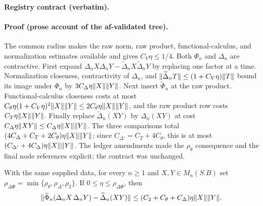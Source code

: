 \noindent\textbf{Registry contract (verbatim).}

\paragraph{Proof (prose account of the af-validated tree).}
The common radius makes the raw norm, raw product, functional-calculus, and normalization
estimates available and gives $C_V\eta\le1/4$.  Both $\Phi_n$ and $\Delta_n$ are contractive.
First expand
$\Delta_nX\Delta_nY-\widetilde\Delta_nX\widetilde\Delta_nY$ by replacing one factor at a
time.  Normalization closeness, contractivity of $\Delta_n$, and
$\lVert \widetilde\Delta_nT\rVert\le(1+C_V\eta)\lVert T\rVert$ bound its image under $\Phi_n$ by
$3C_\Delta\eta\lVert X\rVert\lVert Y\rVert$.  Next insert $\widetilde\Phi_n$ at the raw product.
Functional-calculus closeness costs at most
$C_\theta\eta(1+C_V\eta)^2\lVert X\rVert\lVert Y\rVert\le2C_\theta\eta\lVert X\rVert\lVert Y\rVert$,
and the raw product row costs $C_T\eta\lVert X\rVert\lVert Y\rVert$.  Finally replace
$\widetilde\Delta_n(XY)$ by $\Delta_n(XY)$ at cost
$C_\Delta\eta\lVert XY\rVert\le C_\Delta\eta\lVert X\rVert\lVert Y\rVert$.
The three comparisons total $(4C_\Delta+C_T+2C_\theta)\eta\lVert X\rVert\lVert Y\rVert$;
since $C_{\Delta'}=C_T+4C_\theta$, this is at most
$(C_{\Delta'}+4C_\Delta)\eta\lVert X\rVert\lVert Y\rVert$.  The ledger amendments made the
$\rho_\theta$ consequence and the final node references explicit; the contract was unchanged.

\begin{lemma}\label{lem:routef-delta-phi-product}
With the same supplied data, for every $n\ge1$ and $X,Y\in M_n(S.B)$ set
$\rho_{\Delta\Phi}=\min\{\rho_\theta,\rho_\Delta,\rho_2\}$.  If
$0\le\eta\le\rho_{\Delta\Phi}$, then
\[
 \lVert \widetilde\Phi_n(\Delta_nX\,\Delta_nY)-\widetilde\Delta_n(XY)\rVert
 \le(C_2+C_\theta+C_\Delta)\eta\lVert X\rVert\lVert Y\rVert .
\]
\end{lemma}

